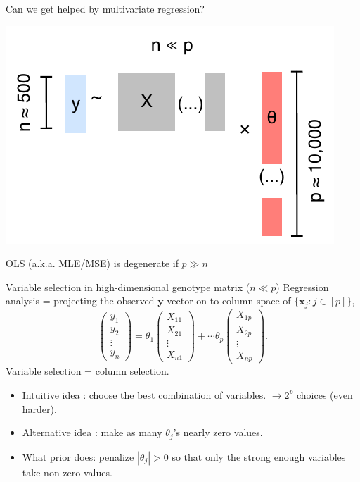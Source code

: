 \documentclass[
  ignorenonframetext,
  aspectratio=169]{beamer}
\begin{document}
\begin{frame}{Can we get helped by multivariate regression?}
\protect\hypertarget{can-we-get-helped-by-multivariate-regression-1}{}
\scriptsize

\begin{center}\includegraphics[width=.7\linewidth]{Vis/intractability1} \end{center}

\normalsize

OLS (a.k.a. MLE/MSE) is degenerate if \(p \gg n\)
\end{frame}

\begin{frame}{Variable selection in high-dimensional genotype matrix
(\(n \ll p\))}
\protect\hypertarget{variable-selection-in-high-dimensional-genotype-matrix-n-ll-p}{}
Regression analysis = projecting the observed \(\mathbf{y}\) vector on
to column space of \(\{\mathbf{x}_{j}: j \in[p]\}\), \[
\left(\begin{array}{l}
y_{1}\\
y_{2}\\
\vdots\\
y_{n}
\end{array}\right)
=
\theta_{1} \left(\begin{array}{l}
X_{11}\\
X_{21}\\
\vdots\\
X_{n1}
\end{array}\right) +
\cdots
\theta_{p} \left(\begin{array}{l}
X_{1p}\\
X_{2p}\\
\vdots\\
X_{np}
\end{array}\right).
\] Variable selection = column selection.

\vfill

\begin{itemize}
\item <1-> Intuitive idea : choose the best combination of variables. $\to 2^{p}$ choices (even harder).
\item <2-> Alternative idea : make as many $\theta_{j}$'s nearly zero values.
\item <3-> What prior does: penalize $|\theta_{j}| > 0$ so that only the strong
  enough variables take non-zero values.
\end{itemize}
\end{frame}
\end{document}
